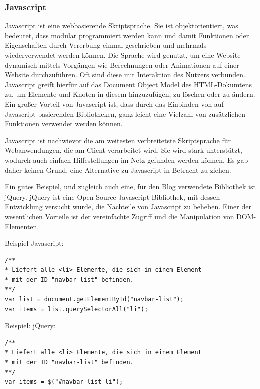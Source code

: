       \subsubsection*{Javascript}
      {Javascript\cite{javascript}} ist eine webbasierende Skriptsprache. Sie ist objektorientiert, was bedeutet, dass modular programmiert werden kann und damit Funktionen oder Eigenschaften
      durch Vererbung einmal geschrieben und mehrmals wiederverwendet werden können. Die Sprache wird genutzt, um eine Website dynamisch mittels Vorgängen wie Berechnungen oder Animationen auf einer Website durchzuführen.
      Oft sind diese mit Interaktion des Nutzers verbunden. Javascript greift hierfür auf das Document Object Model des HTML-Dokumtens zu, um Elemente und Knoten in diesem hinzuzufügen, zu löschen oder
      zu ändern. Ein großer Vorteil von Javascript ist, dass durch das Einbinden von auf Javascript basierenden Bibliotheken, ganz leicht eine Vielzahl von zusätzlichen Funktionen
      verwendet werden können.

      Javascript ist nachwievor die am weitesten verbreitetste Skriptsprache für Webanwendungen, die am Client verarbeitet wird. Sie wird stark unterstützt, wodurch auch einfach Hilfestellungen im Netz
      gefunden werden können. Es gab daher keinen Grund, eine Alternative zu Javascript in Betracht zu ziehen.

      Ein gutes Beispiel, und zugleich auch eine, für den Blog verwendete Bibliothek ist {jQuery\cite{jquery}}.
      jQuery ist eine Open-Source Javascript Bibliothek, mit dessen Entwicklung versucht wurde, die Nachteile von Javascript zu beheben. Einer der wesentlichen Vorteile ist
      der vereinfachte Zugriff und die Manipulation von DOM-Elementen.

      Beispiel Javascript:

\lstset{language= html }
\begin{lstlisting}
/**
* Liefert alle <li> Elemente, die sich in einem Element
* mit der ID "navbar-list" befinden.
**/
var list = document.getElementById("navbar-list");
var items = list.querySelectorAll("li");
\end{lstlisting}

\newpage

      Beispiel: jQuery:

\lstset{ language=html }
\begin{lstlisting}
/**
* Liefert alle <li> Elemente, die sich in einem Element
* mit der ID "navbar-list" befinden.
**/
var items = $("#navbar-list li");
\end{lstlisting}

